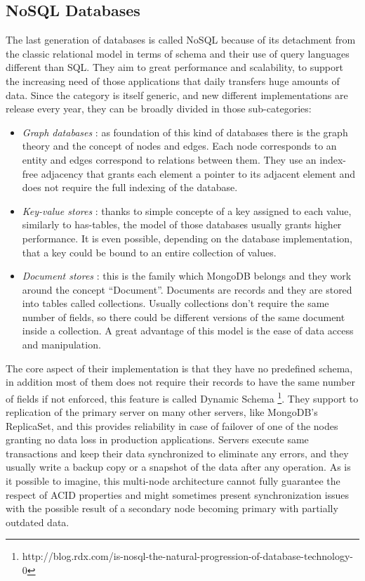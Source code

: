 \subsection{NoSQL Databases}
The last generation of databases is called NoSQL because of its detachment from the classic relational model in terms of schema and their use of query languages different  than SQL.
They  aim to great performance and scalability, to support the increasing need of those applications that daily transfers huge amounts of data.
Since the category is itself generic, and new different implementations are release every year, they can be broadly divided in those sub-categories:
\begin{itemize}
	\item \textit{Graph databases} : as foundation of this kind of databases there is the graph theory and the concept of nodes and edges. Each node corresponds to an entity and edges correspond to relations between them. They use an index-free adjacency that grants each element a pointer to its adjacent element and does not require the full indexing of the database.
	\item \textit{Key-value stores} : thanks to simple concepte of a key assigned to each value, similarly to has-tables, the model of those databases usually grants higher performance. It is even possible, depending on the database implementation, that a key could be bound to an entire collection of values.
	\item \textit{Document stores} : this is the family which MongoDB belongs and they work around the concept “Document”. Documents are records and they are stored into tables called collections. Usually collections don’t require the same number of fields, so there could be different versions of the same document inside a collection. A great advantage of this model is the ease of data access and manipulation.
\end{itemize}
The core aspect of their implementation is that they have no predefined schema, in addition most of them does not require their records to have the same number of fields if not enforced,  this feature is called Dynamic Schema \footnote{http://blog.rdx.com/is-nosql-the-natural-progression-of-database-technology-0}.
They support to replication of the primary server on many other servers, like MongoDB’s ReplicaSet, and this provides reliability in case of failover of one of the nodes granting no data loss in production applications. Servers execute same transactions and keep their data synchronized to eliminate any errors, and they usually write a backup copy or a snapshot of the data after any operation. As is it possible to imagine, this multi-node architecture cannot fully guarantee the respect of ACID properties and might sometimes present synchronization issues with the possible result of a secondary node becoming primary with partially outdated data.
